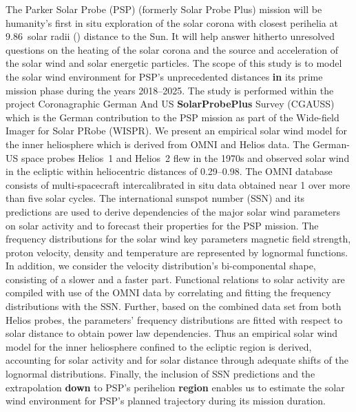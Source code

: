 

% 
% 

\abstracty
{The Parker Solar Probe (PSP) (formerly Solar Probe Plus) mission will be humanity’s first in situ exploration of the solar corona with closest perihelia at \num{9.86}~solar radii (\si{\Rs}) distance to the Sun. It will help answer hitherto unresolved questions on the heating of the solar corona and the source and acceleration of the solar wind and solar energetic particles. The scope of this study is to model the solar wind environment for PSP’s unprecedented distances \textbf{in} its prime mission phase during the years \numrange{2018}{2025}. The study is performed within the project Coronagraphic German And US \textbf{SolarProbePlus} Survey (CGAUSS) which is the German contribution to the PSP mission as part of the Wide-field Imager for Solar PRobe (WISPR).}	%
{We present an empirical solar wind model for the inner heliosphere which is derived from OMNI and Helios data. The German-US space probes Helios~1 and Helios~2 flew in the 1970s and observed solar wind in the ecliptic within heliocentric distances of \SIrange{0.29}{0.98}{\au}. The OMNI database consists of multi-spacecraft intercalibrated in situ data obtained near \SI{1}{\au} over more than five solar cycles. The international sunspot number (SSN) and its predictions are used to derive dependencies of the major solar wind parameters on solar activity and to forecast their properties for the PSP mission.}	%
{The frequency distributions for the solar wind key parameters magnetic field strength, proton velocity, density and temperature are represented by lognormal functions. In addition, we consider the velocity distribution’s bi-componental shape, consisting of a slower and a faster part. Functional relations to solar activity are compiled with use of the OMNI data by correlating and fitting the frequency distributions with the SSN. Further, based on the combined data set from both Helios probes, the parameters’ frequency distributions are fitted with respect to solar distance to obtain power law dependencies. Thus an empirical solar wind model for the inner heliosphere confined to the ecliptic region is derived, accounting for solar activity and for solar distance through adequate shifts of the lognormal distributions. Finally, the inclusion of SSN predictions and the extrapolation \textbf{down} to PSP’s perihelion \textbf{region} enables us to estimate the solar wind environment for PSP’s planned trajectory during its mission duration.}	%
